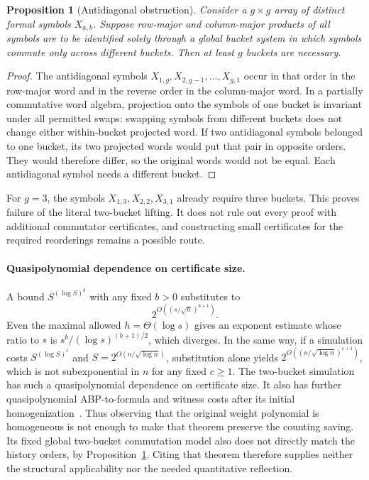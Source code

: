 \documentclass[11pt]{article}
\newtheorem{proposition}[theorem]{Proposition}
\theoremstyle{definition}
\theoremstyle{remark}
\begin{document}
\begin{proposition}[Antidiagonal obstruction]
\label{prop:antidiagonal}
Consider a $g\times g$ array of distinct formal symbols $X_{a,b}$.
Suppose row-major and column-major products of all symbols are to be
identified solely through a global bucket system in which symbols
commute only across different buckets. Then at least $g$ buckets are
necessary.
\end{proposition}

\begin{proof}
The antidiagonal symbols $X_{1,g},X_{2,g-1},\ldots,X_{g,1}$ occur in
that order in the row-major word and in the reverse order in the
column-major word. In a partially commutative word algebra, projection
onto the symbols of one bucket is invariant under all permitted swaps:
swapping symbols from different buckets does not change either
within-bucket projected word. If two antidiagonal symbols belonged to
one bucket, its two projected words would put that pair in opposite
orders. They would therefore differ, so the original words would not
be equal. Each antidiagonal symbol needs a different bucket.
\end{proof}

For $g=3$, the symbols $X_{1,3},X_{2,2},X_{3,1}$ already require
three buckets. This proves failure of the literal two-bucket lifting.
It does not rule out every proof with additional commutator
certificates, and constructing small certificates for the required
reorderings remains a possible route.

\paragraph{Quasipolynomial dependence on certificate size.}
A bound $S^{(\log S)^b}$ with any fixed $b>0$ substitutes to
\[
 2^{O((s/\sqrt h)^{b+1})}.
\]
Even the maximal allowed $h=\Theta(\log s)$ gives an exponent
estimate whose ratio to $s$ is
$s^b/(\log s)^{(b+1)/2}$, which diverges. In the same way, if a
simulation costs $S^{(\log S)^c}$ and $S=2^{O(n/\sqrt{\log n})}$,
substitution alone yields $2^{O((n/\sqrt{\log n})^{c+1})}$, which is
not subexponential in $n$ for any fixed $c\ge1$. The two-bucket
simulation~\cite[Theorems~1.2 and~3.3]{CCGM26} has such a
quasipolynomial dependence on certificate size. It also has further
quasipolynomial ABP-to-formula and witness costs after its initial
homogenization~\cite[Appendices~B.4 and~B.6]{CCGM26}. Thus observing
that the original weight polynomial is homogeneous is not enough to
make that theorem preserve the counting saving. Its fixed global
two-bucket commutation model also does not directly match the history
orders, by Proposition~\ref{prop:antidiagonal}. Citing that theorem
therefore supplies neither the structural applicability nor the
needed quantitative reflection.
\end{document}
